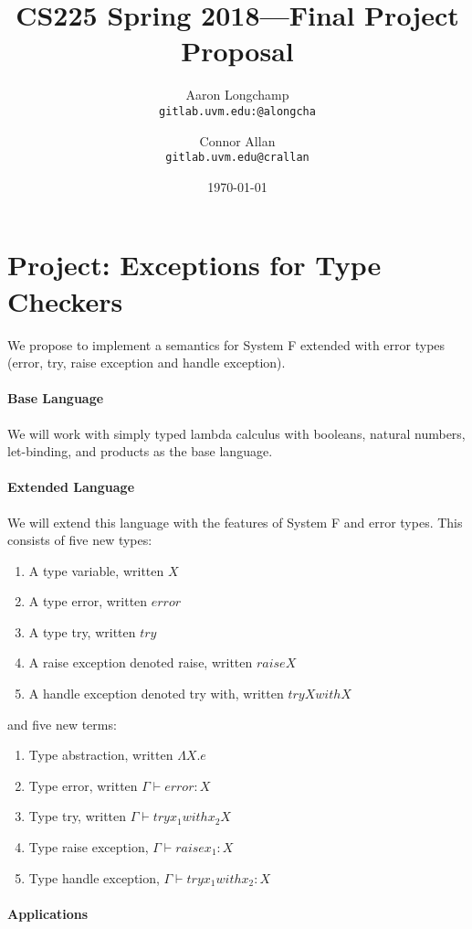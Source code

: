 \documentclass{article}
\title{CS225 Spring 2018---Final Project Proposal}
\author{
  Aaron Longchamp \\ \small{\texttt{gitlab.uvm.edu:@alongcha}}
  \and Connor Allan \\ \small{\texttt{gitlab.uvm.edu@crallan}}
}
\date{\today}
\begin{document}
\maketitle

\section*{Project: Exceptions for Type Checkers}

We propose to implement a semantics for System F extended with error
types (error, try, raise exception and handle exception).

\paragraph{Base Language}

We will work with simply typed lambda calculus with booleans, natural numbers,
let-binding, and products as the base language.

\paragraph{Extended Language}

We will extend this language with the features of System F and error
types. This consists of five new types:
\begin{enumerate}
\item A type variable, written $X$
\item A type error, written $error$
\item A type try, written $try$
\item A raise exception denoted raise, written $raise X$
\item A handle exception denoted try with, written $try X with X$
\end{enumerate}
and five new terms:
\begin{enumerate}
\item Type abstraction, written $\Lambda X.e$
\item Type error, written $\Gamma \vdash error : X$
\item Type try, written $\Gamma \vdash try x_1 with x_2 X$
\item Type raise exception, $\Gamma \vdash raise x_1 :X$
\item Type handle exception, $\Gamma \vdash try x_1 with x_2 : X$
\end{enumerate}


\paragraph{Applications}
\end{document}
